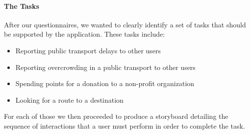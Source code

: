 \documentclass[a4paper, 11pt]{report}
\begin{document}
\paragraph{The Tasks}

After our questionnaires, we wanted to clearly identify a set of tasks that should be
supported by the application. These tasks include:

\begin{itemize}\label{list:tasks}
	\item Reporting public transport delays to other users
	\item Reporting overcrowding in a public transport to other users
	\item Spending points for a donation to a non-profit organization
	\item Looking for a route to a destination
\end{itemize}

For each of those we then proceeded to produce a storyboard detailing the sequence of
interactions that a user must perform in order to complete the task.
\end{document}
